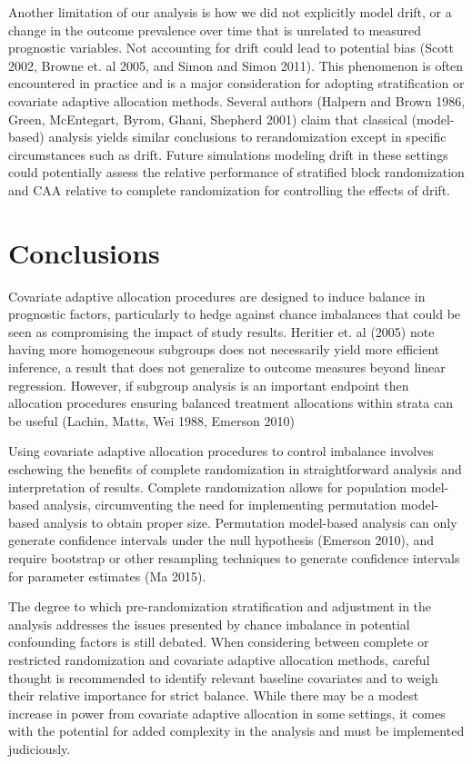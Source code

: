 Another limitation of our analysis is how we did not explicitly model drift, or a change in the outcome prevalence over time that is unrelated to measured prognostic variables.
Not accounting for drift could lead to potential bias (Scott 2002, Browne et. al 2005, and Simon and Simon 2011).
This phenomenon is often encountered in practice and is a major consideration for adopting stratification or covariate adaptive allocation methods.
Several authors (Halpern and Brown 1986, Green, McEntegart, Byrom, Ghani, Shepherd 2001) claim that classical (model-based) analysis yields similar conclusions to rerandomization except in specific circumstances such as drift.
Future simulations modeling drift in these settings could potentially assess the relative performance of stratified block randomization and CAA relative to complete randomization for controlling the effects of drift.

\section{Conclusions}
Covariate adaptive allocation procedures are designed to induce balance in prognostic factors, particularly to hedge against chance imbalances that could be seen as compromising the impact of study results. 
Heritier et. al (2005) note having more homogeneous subgroups does not necessarily yield more efficient inference, a result that does not generalize to outcome measures beyond linear regression.
However, if subgroup analysis is an important endpoint then allocation procedures ensuring balanced treatment allocations within strata can be useful (Lachin, Matts, Wei 1988, Emerson 2010)

Using covariate adaptive allocation procedures to control imbalance involves eschewing the benefits of complete randomization in straightforward analysis and interpretation of results.
Complete randomization allows for population model-based analysis, circumventing the need for implementing permutation model-based analysis to obtain proper size.
Permutation model-based analysis can only generate confidence intervals under the null hypothesis (Emerson 2010), and require bootstrap or other resampling techniques to generate confidence intervals for parameter estimates (Ma 2015).

The degree to which pre-randomization stratification and adjustment in the analysis addresses the issues presented by chance imbalance in potential confounding factors is still debated.
When considering between complete or restricted randomization and covariate adaptive allocation methods, careful thought is recommended to identify relevant baseline covariates and to weigh their relative importance for strict balance.
While there may be a modest increase in power from covariate adaptive allocation in some settings, it comes with the potential for added complexity in the analysis and must be implemented judiciously. 

